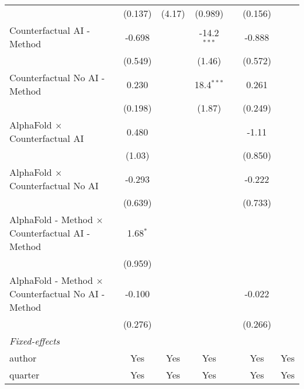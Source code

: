 \begin{tabular}{lcccccc}
                                                              & (0.137)    & (4.17)       & (0.989)       &      & (0.156) &   \\   
   Counterfactual AI - Method                                 & -0.698     &              & -14.2$^{***}$ &      & -0.888  &   \\   
                                                              & (0.549)    &              & (1.46)        &      & (0.572) &   \\   
   Counterfactual No AI - Method                              & 0.230      &              & 18.4$^{***}$  &      & 0.261   &   \\   
                                                              & (0.198)    &              & (1.87)        &      & (0.249) &   \\   
   AlphaFold $\times$ Counterfactual AI                       & 0.480      &              &               &      & -1.11   &   \\   
                                                              & (1.03)     &              &               &      & (0.850) &   \\   
   AlphaFold $\times$ Counterfactual No AI                    & -0.293     &              &               &      & -0.222  &   \\   
                                                              & (0.639)    &              &               &      & (0.733) &   \\   
   AlphaFold - Method $\times$ Counterfactual AI - Method     & 1.68$^{*}$ &              &               &      &         &   \\   
                                                              & (0.959)    &              &               &      &         &   \\   
   AlphaFold - Method $\times$ Counterfactual No AI - Method  & -0.100     &              &               &      & -0.022  &   \\   
                                                              & (0.276)    &              &               &      & (0.266) &   \\   
   \midrule
   \emph{Fixed-effects}\\
   author                                                     & Yes        & Yes          & Yes           &      & Yes     & Yes\\  
   quarter                                                    & Yes        & Yes          & Yes           &      & Yes     & Yes\\  

\end{tabular}
